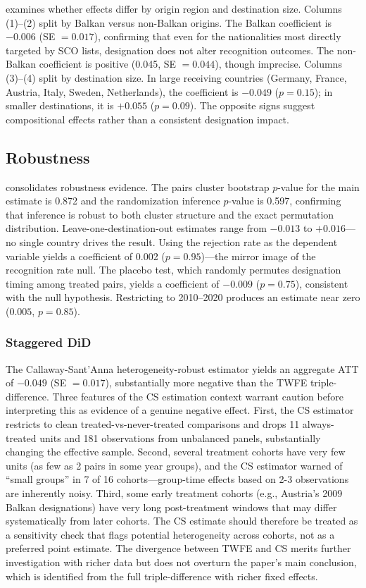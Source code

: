 \documentclass[12pt]{article}
\begin{document}
 examines whether effects differ by origin region and destination size. Columns (1)--(2) split by Balkan versus non-Balkan origins. The Balkan coefficient is $-0.006$ (SE $= 0.017$), confirming that even for the nationalities most directly targeted by SCO lists, designation does not alter recognition outcomes. The non-Balkan coefficient is positive (0.045, SE $= 0.044$), though imprecise. Columns (3)--(4) split by destination size. In large receiving countries (Germany, France, Austria, Italy, Sweden, Netherlands), the coefficient is $-0.049$ ($p = 0.15$); in smaller destinations, it is $+0.055$ ($p = 0.09$). The opposite signs suggest compositional effects rather than a consistent designation impact.



\subsection{Robustness}

 consolidates robustness evidence. The pairs cluster bootstrap $p$-value for the main estimate is 0.872 and the randomization inference $p$-value is 0.597, confirming that inference is robust to both cluster structure and the exact permutation distribution. Leave-one-destination-out estimates range from $-0.013$ to $+0.016$---no single country drives the result. Using the rejection rate as the dependent variable yields a coefficient of 0.002 ($p = 0.95$)---the mirror image of the recognition rate null. The placebo test, which randomly permutes designation timing among treated pairs, yields a coefficient of $-0.009$ ($p = 0.75$), consistent with the null hypothesis. Restricting to 2010--2020 produces an estimate near zero ($0.005$, $p = 0.85$).

\subsubsection*{Staggered DiD} The Callaway-Sant'Anna heterogeneity-robust estimator yields an aggregate ATT of $-0.049$ (SE $= 0.017$), substantially more negative than the TWFE triple-difference. Three features of the CS estimation context warrant caution before interpreting this as evidence of a genuine negative effect. First, the CS estimator restricts to clean treated-vs-never-treated comparisons and drops 11 always-treated units and 181 observations from unbalanced panels, substantially changing the effective sample. Second, several treatment cohorts have very few units (as few as 2 pairs in some year groups), and the CS estimator warned of ``small groups'' in 7 of 16 cohorts---group-time effects based on 2-3 observations are inherently noisy. Third, some early treatment cohorts (e.g., Austria's 2009 Balkan designations) have very long post-treatment windows that may differ systematically from later cohorts. The CS estimate should therefore be treated as a sensitivity check that flags potential heterogeneity across cohorts, not as a preferred point estimate. The divergence between TWFE and CS merits further investigation with richer data but does not overturn the paper's main conclusion, which is identified from the full triple-difference with richer fixed effects.
\end{document}
